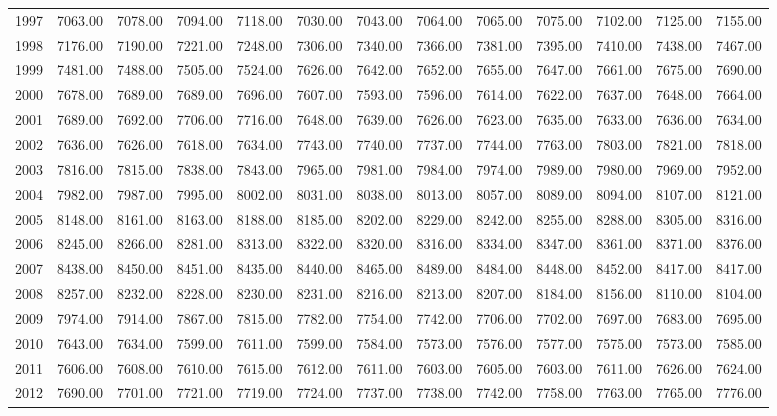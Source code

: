 \begin{longtable}{rrrrrrrrrrrrr}
  1997 & 7063.00 & 7078.00 & 7094.00 & 7118.00 & 7030.00 & 7043.00 & 7064.00 & 7065.00 & 7075.00 & 7102.00 & 7125.00 & 7155.00 \\ 
  1998 & 7176.00 & 7190.00 & 7221.00 & 7248.00 & 7306.00 & 7340.00 & 7366.00 & 7381.00 & 7395.00 & 7410.00 & 7438.00 & 7467.00 \\ 
  1999 & 7481.00 & 7488.00 & 7505.00 & 7524.00 & 7626.00 & 7642.00 & 7652.00 & 7655.00 & 7647.00 & 7661.00 & 7675.00 & 7690.00 \\ 
  2000 & 7678.00 & 7689.00 & 7689.00 & 7696.00 & 7607.00 & 7593.00 & 7596.00 & 7614.00 & 7622.00 & 7637.00 & 7648.00 & 7664.00 \\ 
  2001 & 7689.00 & 7692.00 & 7706.00 & 7716.00 & 7648.00 & 7639.00 & 7626.00 & 7623.00 & 7635.00 & 7633.00 & 7636.00 & 7634.00 \\ 
  2002 & 7636.00 & 7626.00 & 7618.00 & 7634.00 & 7743.00 & 7740.00 & 7737.00 & 7744.00 & 7763.00 & 7803.00 & 7821.00 & 7818.00 \\ 
  2003 & 7816.00 & 7815.00 & 7838.00 & 7843.00 & 7965.00 & 7981.00 & 7984.00 & 7974.00 & 7989.00 & 7980.00 & 7969.00 & 7952.00 \\ 
  2004 & 7982.00 & 7987.00 & 7995.00 & 8002.00 & 8031.00 & 8038.00 & 8013.00 & 8057.00 & 8089.00 & 8094.00 & 8107.00 & 8121.00 \\ 
  2005 & 8148.00 & 8161.00 & 8163.00 & 8188.00 & 8185.00 & 8202.00 & 8229.00 & 8242.00 & 8255.00 & 8288.00 & 8305.00 & 8316.00 \\ 
  2006 & 8245.00 & 8266.00 & 8281.00 & 8313.00 & 8322.00 & 8320.00 & 8316.00 & 8334.00 & 8347.00 & 8361.00 & 8371.00 & 8376.00 \\ 
  2007 & 8438.00 & 8450.00 & 8451.00 & 8435.00 & 8440.00 & 8465.00 & 8489.00 & 8484.00 & 8448.00 & 8452.00 & 8417.00 & 8417.00 \\ 
  2008 & 8257.00 & 8232.00 & 8228.00 & 8230.00 & 8231.00 & 8216.00 & 8213.00 & 8207.00 & 8184.00 & 8156.00 & 8110.00 & 8104.00 \\ 
  2009 & 7974.00 & 7914.00 & 7867.00 & 7815.00 & 7782.00 & 7754.00 & 7742.00 & 7706.00 & 7702.00 & 7697.00 & 7683.00 & 7695.00 \\ 
  2010 & 7643.00 & 7634.00 & 7599.00 & 7611.00 & 7599.00 & 7584.00 & 7573.00 & 7576.00 & 7577.00 & 7575.00 & 7573.00 & 7585.00 \\ 
  2011 & 7606.00 & 7608.00 & 7610.00 & 7615.00 & 7612.00 & 7611.00 & 7603.00 & 7605.00 & 7603.00 & 7611.00 & 7626.00 & 7624.00 \\ 
  2012 & 7690.00 & 7701.00 & 7721.00 & 7719.00 & 7724.00 & 7737.00 & 7738.00 & 7742.00 & 7758.00 & 7763.00 & 7765.00 & 7776.00 \\ 

\end{longtable}
